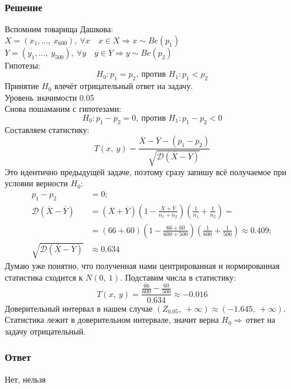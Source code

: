 \documentclass[12pt, a4paper]{article}
\newcommand{\dev}{\mathcal{D}}
\begin{document}
\subsubsection*{Решение}
Вспомним товарища Дашкова:\\
$X = (x_1,\dots,\ x_{600}),\ \forall x\quad x\in X\Rightarrow x\sim Be(p_1)$\\
$Y = (y_1,\dots,\ y_{500}),\ \forall y\quad y\in Y\Rightarrow y\sim Be(p_2)$\\
Гипотезы:
\[H_0: p_1 = p_2,\ \text{против } H_1: p_1 < p_2\]
Принятие $H_0$ влечёт отрицательный ответ на задачу.\\
Уровень значимости 0.05\\
Снова пошаманим с гипотезами:
\[H_0: p_1 - p_2 = 0,\ \text{против } H_1: p_1 - p_2 < 0\]
Составляем статистику:
\[T(x,\ y) = \frac{\overline{X} - \overline{Y} - (p_1 - p_2)}{\sqrt{\dev \left( \overline{X} - \overline{Y} \right)}}\]
Это идентично предыдущей задаче, поэтому сразу запишу всё получаемое при условии верности $H_0$:
\begin{equation*}
    \begin{aligned}
        p_1 - p_2                                             & = 0;                                                                                                                                                      \\
        \dev\left( \overline{X} - \overline{Y} \right)        & = \left( \overline{X} + \overline{Y} \right)\left( 1 - \frac{\overline{X} + \overline{Y}}{n_1 + n_2} \right)\left( \frac{1}{n_1} + \frac{1}{n_2} \right)= \\
                                                              & =(66 + 60)\left( 1 - \frac{66+60}{600+500} \right)\left( \frac{1}{600} + \frac{1}{500} \right) \approx 0.409;                                             \\
        \sqrt{\dev\left( \overline{X} - \overline{Y} \right)} & \approx 0.634
    \end{aligned}
\end{equation*}
Думаю уже понятно, что полученная нами центрированная и нормированная статистика сходится к $N(0,\ 1)$.
Подставим числа в статистику:
\[T(x,\ y) = \frac{\frac{66}{600} - \frac{60}{500}}{0.634} \approx -0.016\]
Доверительный интервал в нашем случае $\left( Z_{0.05},\ +\infty \right) \approx (-1.645,\ +\infty)$. Статистика лежит в доверительном интервале, значит верна $H_0\Rightarrow\,$ответ на задачу отрицательный.
\subsubsection*{Ответ}
Нет, нельзя
\end{document}
